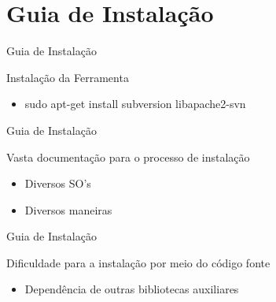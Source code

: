 \section{Guia de Instalação}

\begin{frame}{Guia de Instalação}{}
\begin{block}{Instalação da Ferramenta}
  \begin{itemize}
    \item<1-> sudo apt-get install subversion libapache2-svn
  \end{itemize}
\end{block}
\end{frame}

\begin{frame}{Guia de Instalação}
\begin{block}{Vasta documentação para o processo de instalação}
  \begin{itemize}
    \item<1-> Diversos SO's
    \item<1-> Diversos maneiras
  \end{itemize}
\end{block}
\end{frame}

\begin{frame}{Guia de Instalação}
\begin{block}{Dificuldade para a instalação por meio do código fonte}
  \begin{itemize}
    \item<1-> Dependência de outras bibliotecas auxiliares
  \end{itemize}
\end{block}
\end{frame}
